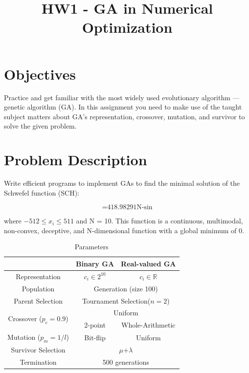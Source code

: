 ﻿\documentclass[conference]{IEEEtran}
\begin{document}
 
\begin{CJK}{UTF8}{bsmi}

\title{HW1 - GA in Numerical Optimization}
 
\author{
}

\maketitle

\section{Objectives}
Practice and get familiar with the most widely used evolutionary algorithm — genetic algorithm
(GA). In this assignment you need to make use of the taught subject matters about GA’s
representation, crossover, mutation, and survivor to solve the given problem.

\section{Problem Description}
Write efficient programs to implement GAs to find the minimal solution of the Schwefel function
(SCH):

\begin{displaymath}
\mathop{f_{SCH}\left(\vec{x}\right)=418.98291N-{\sum_{i=1}^N}x_{i}\sin\left(\sqrt{|x_{i}|}\right)}
\end{displaymath}

where $-512\leq x_{i}\leq511$ and N = 10. This function is a continuous, multimodal, non-convex,
deceptive, and N-dimensional function with a global minimum of 0.

\begin{table}[htbp]
\caption{Parameters}
\begin{center}
\begin{tabular}{|c|c|c|}
\hline 
    & Binary GA & Real-valued GA\tabularnewline
\hline 
\hline 
Representation & $c_{i}$$\in$$2^{10}$ & $c_{i}$$\in$$\mathbb{R}$\tabularnewline
\hline 
Population & \multicolumn{2}{c|}{Generation (size 100)}\tabularnewline
\hline 
Parent Selection & \multicolumn{2}{c|}{Tournament Selection($\mathrel{n=2}$)}\tabularnewline
\hline 
\multirow{2}{*}{Crossover ($p_{c}=0.9$)} & \multicolumn{2}{c|}{Uniform}\tabularnewline
\cline{2-3} 
    & 2-point & Whole-Arithmetic\tabularnewline
\hline 
Mutation ($p_{m}=1/l$) & Bit-flip & Uniform\tabularnewline
\hline 
Survivor Selection & \multicolumn{2}{c|}{$\mu$$+\lambda$ }\tabularnewline
\hline 
Termination & \multicolumn{2}{c|}{500 generations}\tabularnewline
\hline 
\end{tabular}
\end{center}
\end{table}
    

\end{CJK}
\end{document}
